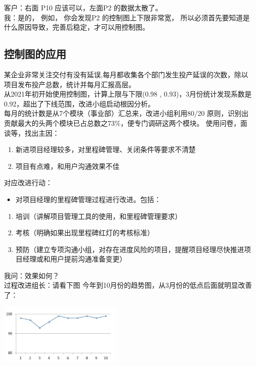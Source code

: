 客户：右面 P10 应该可以，左面P2 的数据太散了。\\
我：是的， 例如， 你会发现P2 的控制图上下限非常宽，
所以必须首先要知道是什么原因导致，完善后稳定，才可以用控制图。\\

\hypertarget{ux63a7ux5236ux56feux7684ux5e94ux7528}{%
\subsection{控制图的应用}\label{ux63a7ux5236ux56feux7684ux5e94ux7528}}

某企业非常关注交付有没有延误,每月都收集各个部门发生投产延误的次数，除以项目发布投产总数，统计并每月汇报高层。\\
从2021年初开始使用控制图，计算上限与下限(0.98 ,
0.93)，3月份统计发现系数是0.92，超出了下线范围，改进小组启动根因分析。\\
每月的统计数是从7个模块（事业部）汇总来，改进小组利用80/20
原则，识别出贡献最大的头两个模块已占总数之73\%，便专门调研这两个模块。
使用问卷，面谈等，找出主因：

\begin{enumerate}
\tightlist
\item
  新进项目经理较多，对里程碑管理、关闭条件等要求不清楚
\item
  项目有点难，和用户沟通效果不佳
\end{enumerate}

对应改进行动：

\begin{itemize}
\tightlist
\item
  对项目经理的里程碑管理过程进行改进。包括：
\end{itemize}

\begin{enumerate}
\tightlist
\item
  培训（讲解项目管理工具的使用，和里程碑管理要求）
\item
  考核（明确如果出现里程碑红灯的考核标准）
\item
  预防（建立专项沟通小组，对存在进度风险的项目，提醒项目经理尽快推进项目经理或和用户提前沟通准备变更）
\end{enumerate}

我问：效果如何？\\
过程改进组长：请看下图
今年到10月份的趋势图，从3月份的低点后面就明显改善了：


\includegraphics[width=6cm]{M3_CC_figure1.jpg}

